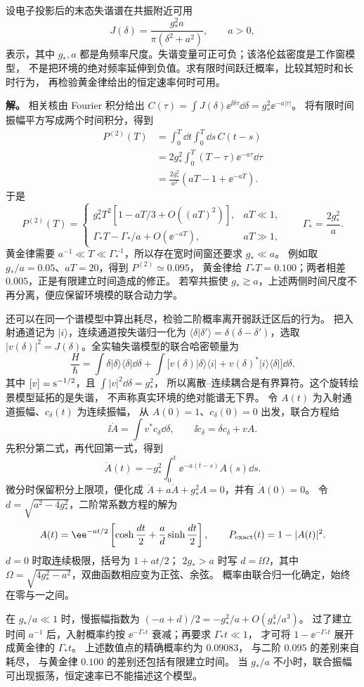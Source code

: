 \begin{exbox}
设电子投影后的末态失谐谱在共振附近可用
\[
J(\delta)=\frac{g_*^2a}{\pi(\delta^2+a^2)},\qquad a>0,
\]
表示，其中 $g_*,a$ 都是角频率尺度。失谐变量可正可负；该洛伦兹密度是工作窗模型，
不是把环境的绝对频率延伸到负值。求有限时间跃迁概率，比较其短时和长时行为，
再检验黄金律给出的恒定速率何时可用。

\textbf{解。} 相关核由 Fourier 积分给出
$C(\tau)=\int J(\delta)\ee^{\ii\delta\tau}\dd\delta
=g_*^2\ee^{-a|\tau|}$。
将有限时间振幅平方写成两个时间积分，得到
\begin{align*}
P^{(2)}(T)&=\int_0^T\dd t\int_0^T\dd s\,C(t-s)\\
&=2g_*^2\int_0^T(T-\tau)\ee^{-a\tau}\dd\tau\\
&=\frac{2g_*^2}{a^2}(aT-1+\ee^{-aT}).
\end{align*}
于是
\begin{equation}
P^{(2)}(T)=
\begin{cases}
g_*^2T^2[1-aT/3+O((aT)^2)],&aT\ll1,\\
\Gamma_*T-\Gamma_*/a+O(\ee^{-aT}),&aT\gg1,
\end{cases}
\qquad \Gamma_*=\frac{2g_*^2}{a}.
\label{eq:feqo-lorentzian-spectrum-golden-window}
\end{equation}
黄金律需要 $a^{-1}\ll T\ll\Gamma_*^{-1}$，所以存在宽时间窗还要求 $g_*\ll a$。
例如取 $g_*/a=0.05$、$aT=20$，得到 $P^{(2)}\simeq0.095$，
黄金律给 $\Gamma_*T=0.100$；两者相差 $0.005$，正是有限建立时间造成的修正。
若窄共振使 $g_*\gtrsim a$，上述两侧时间尺度不再分离，便应保留环境模的联合动力学。

还可以在同一个谱模型中算出耗尽，检验二阶概率离开弱跃迁区后的行为。
把入射通道记为 $|i\rangle$，连续通道按失谐归一化为
$\langle\delta|\delta'\rangle=\delta(\delta-\delta')$，选取
$|v(\delta)|^2=J(\delta)$。全实轴失谐模型的联合哈密顿量为
\[
\frac H\hbar=\int\delta|\delta\rangle\langle\delta|\dd\delta
+\int\bigl[v(\delta)|\delta\rangle\langle i|
+v(\delta)^*|i\rangle\langle\delta|\bigr]\dd\delta.
\]
其中 $[v]={\rm s^{-1/2}}$，且 $\int|v|^2\dd\delta=g_*^2$，
所以离散--连续耦合是有界算符。这个旋转绘景模型延拓的是失谐，
不声称真实环境的绝对能谱无下界。
令 $A(t)$ 为入射通道振幅、$c_\delta(t)$ 为连续振幅，
从 $A(0)=1$、$c_\delta(0)=0$ 出发，联合方程给
\[
\ii\dot A=\int v^*c_\delta\dd\delta,\qquad
\ii\dot c_\delta=\delta c_\delta+vA.
\]
先积分第二式，再代回第一式，得到
\[
\dot A(t)=-g_*^2\int_0^t\ee^{-a(t-s)}A(s)\dd s.
\]
微分时保留积分上限项，便化成
$\ddot A+a\dot A+g_*^2A=0$，并有 $\dot A(0)=0$。
令 $d=\sqrt{a^2-4g_*^2}$，二阶常系数方程的解为
\begin{equation}
A(t)=\ee^{-at/2}
\left[\cosh\frac{dt}{2}+\frac a d\sinh\frac{dt}{2}\right],
\qquad P_{\rm exact}(t)=1-|A(t)|^2.
\label{eq:feqo-lorentzian-exact-survival}
\end{equation}
$d=0$ 时取连续极限，括号为 $1+at/2$；
$2g_*>a$ 时写 $d=\ii\Omega$，其中
$\Omega=\sqrt{4g_*^2-a^2}$，双曲函数相应变为正弦、余弦。
概率由联合归一化确定，始终在零与一之间。

在 $g_*/a\ll1$ 时，慢振幅指数为
$(-a+d)/2=-g_*^2/a+O(g_*^4/a^3)$。
过了建立时间 $a^{-1}$ 后，入射概率约按
$\ee^{-\Gamma_*t}$ 衰减；再要求 $\Gamma_*t\ll1$，
才可将 $1-\ee^{-\Gamma_*t}$ 展开成黄金律的 $\Gamma_*t$。
上述数值点的精确概率约为 $0.09083$，
与二阶 $0.095$ 的差别来自耗尽，
与黄金律 $0.100$ 的差别还包括有限建立时间。
当 $g_*/a$ 不小时，联合振幅可出现振荡，恒定速率已不能描述这个模型。
\end{exbox}
